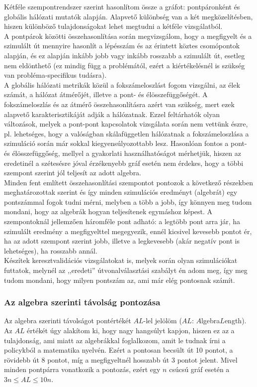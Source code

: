     Kétféle szempontrendszer szerint hasonlítom össze a gráfot: pontpáronként és globális hálózati mutatók alapján. Alapvető különbség van a két megközelítésben, hiszen különböző tulajdonságokat lehet megtudni a kétféle vizsgálatból.\\

    A pontpárok közötti összehasonlítása során megvizsgálom, hogy a megfigyelt és a szimulált út mennyire hasonlít a lépésszám és az érintett köztes csomópontok alapján, és ez alapján inkább jobb vagy inkább rosszabb a szimulált út, esetleg nem eldönthető (ez mindig függ a problémától, ezért a kiértékelésnél is szükség van probléma-specifikus tudásra).\\

    A globális hálózati metrikák közül a fokszámeloszlást fogom vizsgálni, az élek számát, a hálózat átmérőjét, illetve a pont- és élösszefüggőségét. A fokszámeloszlás és az átmérő összehasonlításra azért van szükség, mert ezek alapvető karakterisztikáját adják a hálózatnak. Ezzel feltárhatók olyan változások, melyek a pont-pont kapcsolatok vizsgálata során nem vettünk észre, pl. lehetséges, hogy a valóságban skálafüggetlen hálózatnak a fokszámeloszlása a szimuláció során már sokkal kiegyensúlyozottabb lesz. Hasonlóan fontos a pont- és élösszefüggőség, mellyel a gyakorlati használhatóságot mérhetjük, hiszen az eredetinél a szétesésre jóval érzékenyebb gráf esetén nem érdekes, hogy a többi szempont szerint jól teljesít az adott algebra.\\

    Minden fent említett összehasonlítási szempontot pontozok a következő részekben meghatározottak szerint és így minden szimulációs eredményt (algebrát) egy pontszámmal fogok tudni mérni, melyben a több a jobb, így könnyen meg tudom mondani, hogy az algebrák hogyan teljesítenek egymáshoz képest. A szempontoknál jellemzően háromféle pont adható: a legtöbb pont arra jár, ha szimulált eredmény a megfigyelttel megegyezik, ennél kicsivel kevesebb pontot ér, ha az adott szempont szerint jobb, illetve a legkevesebb (akár negatív pont is lehetséges), ha rosszabb annál.\\
    Készítek keresztvalidációs vizsgálatokat is, melyek során olyan szimulációkat futtatok, melynél az ,,eredeti'' útvonalválasztási szabályt én adom meg, így meg tudom mondani, hogy milyen pontszám az, ami már elég pontosnak számít.

    \subsubsection{Az algebra szerinti távolság pontozása}
    Az algebra szerinti távolságot pontértékét $AL$-lel jelölöm ($AL$: $A$lgebra$L$ength). Az $AL$ értékét úgy alakítom ki, hogy nagy hangsúlyt kapjon, hiszen ez az a tulajdonság, ami miatt az algebrákkal foglalkozom, amit le tudnak írni a policykból a matematika nyelvén. Ezért a pontosan becsült út 10 pontot, a rövidebb út 8 pontot, míg a megfigyeltnél hosszabb út 3 pontot jelent. Mivel minden pontpárra vonatkozik a pontozás, ezért egy $n$ csúcsú gráf esetén a $3n \leq AL \leq 10n$.

